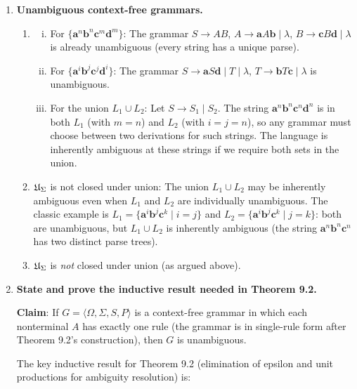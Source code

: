 \begin{enumerate}[{9.}1. ]
\item \textbf{Unambiguous context-free grammars.}

\begin{enumerate}
\item
\begin{enumerate}[i.]
\item For $\{\pmb{a}^n\pmb{b}^n\pmb{c}^m\pmb{d}^m\}$: The grammar $S \to AB$, $A \to \pmb{a}A\pmb{b}\mid\lambda$, $B \to \pmb{c}B\pmb{d}\mid\lambda$ is already unambiguous (every string has a unique parse).

\item For $\{\pmb{a}^i\pmb{b}^j\pmb{c}^j\pmb{d}^i\}$: The grammar $S \to \pmb{a}S\pmb{d}\mid T\mid\lambda$, $T \to \pmb{b}T\pmb{c}\mid\lambda$ is unambiguous.

\item For the union $L_1 \cup L_2$: Let $S \to S_1 \mid S_2$. The string $\pmb{a}^n\pmb{b}^n\pmb{c}^n\pmb{d}^n$ is in both $L_1$ (with $m=n$) and $L_2$ (with $i=j=n$), so any grammar must choose between two derivations for such strings. The language is inherently ambiguous at these strings if we require both sets in the union.
\end{enumerate}

\item $\mathfrak{U}_\Sigma$ is not closed under union: The union $L_1 \cup L_2$ may be inherently ambiguous even when $L_1$ and $L_2$ are individually unambiguous. The classic example is $L_1 = \{\pmb{a}^i\pmb{b}^j\pmb{c}^k \mid i=j\}$ and $L_2 = \{\pmb{a}^i\pmb{b}^j\pmb{c}^k \mid j=k\}$: both are unambiguous, but $L_1 \cup L_2$ is inherently ambiguous (the string $\pmb{a}^n\pmb{b}^n\pmb{c}^n$ has two distinct parse trees).

\item $\mathfrak{U}_\Sigma$ is \emph{not} closed under union (as argued above).
\end{enumerate}

\item \textbf{State and prove the inductive result needed in Theorem 9.2.}

\textbf{Claim}: If $G = \langle\Omega,\Sigma,S,P\rangle$ is a context-free grammar in which each nonterminal $A$ has exactly one rule (the grammar is in single-rule form after Theorem 9.2's construction), then $G$ is unambiguous.

The key inductive result for Theorem 9.2 (elimination of epsilon and unit productions for ambiguity resolution) is:


\end{enumerate}
